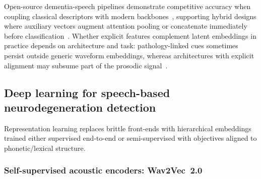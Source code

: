 Open-source dementia-speech pipelines demonstrate competitive accuracy when coupling classical descriptors with modern backbones~\cite{ntampakis2025neuroxvocal}, supporting hybrid designs where auxiliary vectors augment attention pooling or concatenate immediately before classification~\cite{esteve2025speechadppa}.
Whether explicit features complement latent embeddings in practice depends on architecture and task: pathology-linked cues sometimes persist outside generic waveform embeddings, whereas architectures with explicit alignment may subsume part of the prosodic signal~\cite{ortiz2025cognialign}.

\subsection{Deep learning for speech-based neurodegeneration detection}

Representation learning replaces brittle front-ends with hierarchical embeddings trained either supervised end-to-end or semi-supervised with objectives aligned to phonetic/lexical structure.

\subsubsection{Self-supervised acoustic encoders: Wav2Vec~2.0}

